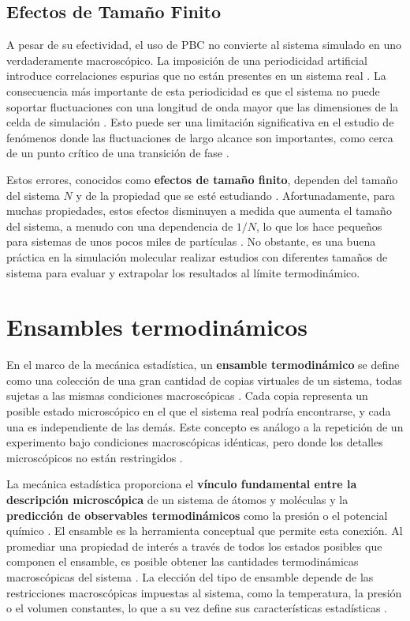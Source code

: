 \subsection{Efectos de Tamaño Finito}

A pesar de su efectividad, el uso de PBC no convierte al sistema simulado en uno verdaderamente macroscópico. La imposición de una periodicidad artificial introduce correlaciones espurias que no están presentes en un sistema real \cite[66]{frenkel2002understanding}. La consecuencia más importante de esta periodicidad es que el sistema no puede soportar fluctuaciones con una longitud de onda mayor que las dimensiones de la celda de simulación \cite[66]{frenkel2002understanding}. Esto puede ser una limitación significativa en el estudio de fenómenos donde las fluctuaciones de largo alcance son importantes, como cerca de un punto crítico de una transición de fase \cite[66]{frenkel2002understanding}.

Estos errores, conocidos como \textbf{efectos de tamaño finito}, dependen del tamaño del sistema $N$ y de la propiedad que se esté estudiando \cite[154]{haile1992molecular}. Afortunadamente, para muchas propiedades, estos efectos disminuyen a medida que aumenta el tamaño del sistema, a menudo con una dependencia de $1/N$, lo que los hace pequeños para sistemas de unos pocos miles de partículas \cite[167]{frenkel2002understanding}. No obstante, es una buena práctica en la simulación molecular realizar estudios con diferentes tamaños de sistema para evaluar y extrapolar los resultados al límite termodinámico.

\section{Ensambles termodinámicos}

En el marco de la mecánica estadística, un \textbf{ensamble termodinámico} se define como una colección de una gran cantidad de copias virtuales de un sistema, todas sujetas a las mismas condiciones macroscópicas \cite[97]{zhou2022molecular}. Cada copia representa un posible estado microscópico en el que el sistema real podría encontrarse, y cada una es independiente de las demás. Este concepto es análogo a la repetición de un experimento bajo condiciones macroscópicas idénticas, pero donde los detalles microscópicos no están restringidos \cite[97]{zhou2022molecular}.

La mecánica estadística proporciona el \textbf{vínculo fundamental entre la descripción microscópica} de un sistema de átomos y moléculas y la \textbf{predicción de observables termodinámicos} como la presión o el potencial químico \cite[50]{frenkel2002understanding}. El ensamble es la herramienta conceptual que permite esta conexión. Al promediar una propiedad de interés a través de todos los estados posibles que componen el ensamble, es posible obtener las cantidades termodinámicas macroscópicas del sistema \cite[98]{zhou2022molecular}. La elección del tipo de ensamble depende de las restricciones macroscópicas impuestas al sistema, como la temperatura, la presión o el volumen constantes, lo que a su vez define sus características estadísticas \cite[98]{zhou2022molecular}.

